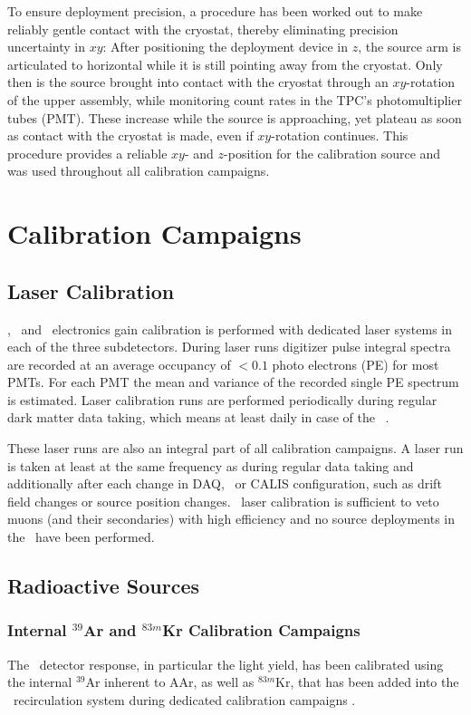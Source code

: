 To ensure deployment precision, a procedure has been worked out to make reliably gentle contact with the cryostat, thereby eliminating precision uncertainty in $xy$: After positioning the deployment device in $z$, the source arm is articulated to horizontal while it is still pointing away from the cryostat. Only then is the source brought into contact with the cryostat through an $xy$-rotation of the upper assembly, while monitoring count rates in the TPC's photomultiplier tubes (PMT).  These increase while the source is approaching, yet plateau as soon as contact with the cryostat is made, even if $xy$-rotation continues. This procedure provides a reliable $xy$- and $z$-position for the calibration source and was used throughout all calibration campaigns.


\section{Calibration Campaigns}\label{sec:CalibCampaigns}
\subsection{Laser Calibration}
\wcv, \lsv\ and \tpc\ electronics gain calibration is performed with dedicated laser systems in each of the three subdetectors. During laser runs digitizer pulse integral spectra are recorded at an average occupancy of $< 0.1$ photo electrons (PE) for most PMTs. For each PMT  the mean and variance of the recorded single PE spectrum is estimated. Laser calibration runs are performed periodically during regular dark matter data taking, which means at least daily in case of the \tpc\ \cite{Agnes:2015gu}. 

These laser runs are also an integral part of all calibration campaigns. A laser run is taken at least at the same frequency as during regular data taking and additionally after each change in DAQ, \tpc\ or CALIS configuration, such as drift field changes or source position changes. \wcv\ laser calibration is sufficient to veto muons (and their secondaries) with high efficiency and no source deployments in the \wcv\ have been performed.

\subsection{Radioactive Sources}
\subsubsection{Internal $^{39}$Ar and $^{83m}$Kr Calibration Campaigns}
The \tpc\ detector response, in particular the light yield, has been calibrated using the internal $^{39}$Ar inherent to AAr, as well as $^{83m}$Kr, that has been added into the \lar\ recirculation system during dedicated calibration campaigns \cite{Agnes:2015gu}.

